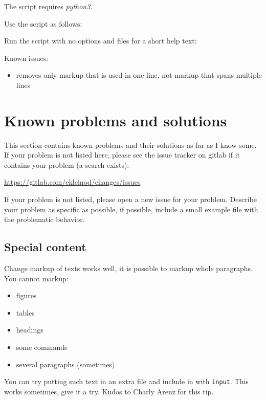 The script requires \emph{python3}.

Use the script as follows:


Run the script with no options and files for a short help text:


Known issues:

\begin{itemize}
	\item removes only markup that is used in one line, not markup that spans multiple lines
\end{itemize}


\cleardoublepage
\section{Known problems and solutions}
\label{sec:known-problems}

This section contains known problems and their solutions as far as I know some.
If your problem is not listed here, please see the issue tracker on gitlab if it contains your problem (a search exists):

\url{https://gitlab.com/ekleinod/changes/issues}

If your problem is not listed, please open a new issue for your problem.
Describe your problem as specific as possible, if possible, include a small example file with the problematic behavior.

\subsection{Special content}

Change markup of texts works well, it is possible to markup whole paragraphs.
You cannot markup:

\begin{itemize}
	\item figures
	\item tables
	\item headings
	\item some commands
	\item several paragraphs (sometimes)
\end{itemize}

You can try putting such text in an extra file and include in with \texttt{input}.
This works sometimes, give it a try.
Kudos to Charly Arenz for this tip.

